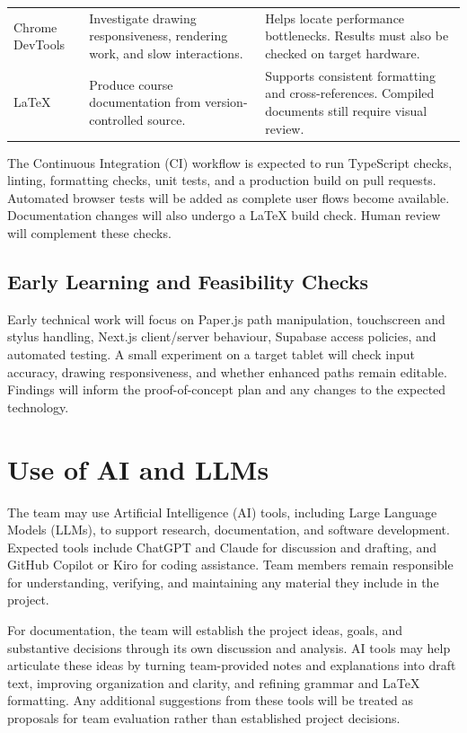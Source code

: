 \documentclass{article}
\begin{document}
\begin{table}[htbp]
\begin{tabularx}{\textwidth}{
        @{}>{\raggedright\arraybackslash}p{}
        >{\raggedright\arraybackslash}X
        >{\raggedright\arraybackslash}X@{}
    }
        Chrome DevTools &
        Investigate drawing responsiveness, rendering work,
        and slow interactions. &
        Helps locate performance bottlenecks.
        Results must also be checked on target hardware. \\
        \addlinespace

        \LaTeX{} &
        Produce course documentation from version-controlled source. &
        Supports consistent formatting and cross-references.
        Compiled documents still require visual review. \\

        \bottomrule
    \end{tabularx}
\end{table}

The Continuous Integration (CI) workflow is expected to run TypeScript
checks, linting, formatting checks, unit tests, and a production build
on pull requests. Automated browser tests will be added as complete
user flows become available. Documentation changes will also undergo
a \LaTeX{} build check. Human review will complement these checks.

\subsection{Early Learning and Feasibility Checks}

Early technical work will focus on Paper.js path manipulation,
touchscreen and stylus handling, Next.js client/server behaviour,
Supabase access policies, and automated testing. A small experiment
on a target tablet will check input accuracy, drawing responsiveness,
and whether enhanced paths remain editable. Findings will inform
the proof-of-concept plan and any changes to the expected technology.

\section{Use of AI and LLMs}
\label{sec:ai-use}

The team may use Artificial Intelligence (AI) tools, including Large
Language Models (LLMs), to support research, documentation, and software
development. Expected tools include ChatGPT and Claude for discussion
and drafting, and GitHub Copilot or Kiro for coding assistance.
Team members remain responsible for understanding, verifying, and
maintaining any material they include in the project.

For documentation, the team will establish the project ideas,
goals, and substantive decisions through its own discussion and
analysis. AI tools may help articulate these ideas by turning
team-provided notes and explanations into draft text, improving
organization and clarity, and refining grammar and \LaTeX{}
formatting. Any additional suggestions from these tools will be
treated as proposals for team evaluation rather than established
project decisions.
\end{document}
